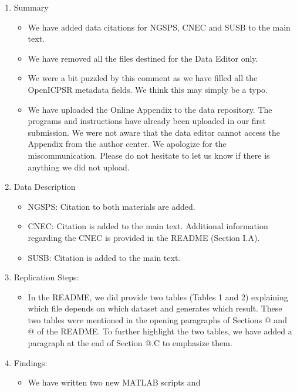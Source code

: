 \documentclass[twoside,12pt,leqno]{article}
\makeatletter
\newcommand*{\rom}[1]{\expandafter\@slowromancap\romannumeral #1@}
\newcommand{\bcode}[1]{\texttt{\blue{#1}}}
\makeatother
\begin{document}
\begin{enumerate}
    \item
    Summary
    \begin{itemize}
        \item
        We have added data citations for NGSPS, CNEC and SUSB to the main text.
        \item
        We have removed all the files destined for the Data Editor only.
        \item
        We were a bit puzzled by this comment as we have filled all the OpenICPSR metadata fields. We think this may simply be a typo.
        \item
        We have uploaded the Online Appendix to the data repository. The programs and instructions have already been uploaded in our first submission. We were not aware that the data editor cannot access the Appendix from the author center. We apologize for the miscommunication. Please do not hesitate to let us know if there is anything we did not upload.
    \end{itemize}
    \item
    Data Description
    \begin{itemize}
        \item
        NGSPS: Citation to both materials are added.
        \item
        CNEC: Citation is added to the main text. Additional information regarding the CNEC is provided in the README (Section I.A).
        \item
        SUSB: Citation is added to the main text.
    \end{itemize}
    \item
    Replication Steps:
    \begin{itemize}
        \item
        In the README, we did provide two tables (Tables 1 and 2) explaining which file depends on which dataset and generates which result. These two tables were mentioned in the opening paragraphs of Sections \rom{2} and \rom{3} of the README. To further highlight the two tables, we have added a paragraph at the end of Section \rom{1}.C to emphasize them.
    \end{itemize}    
    \item
    Findings:
    \begin{itemize}
        \item
        We have written two new MATLAB scripts \bcode{generate\_tables\_main.m} and \\

\end{itemize}
\end{enumerate}
\end{document}
